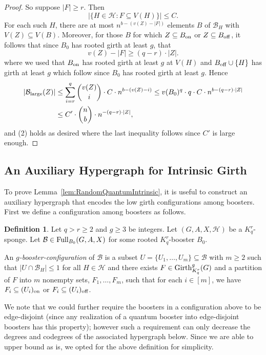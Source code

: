 \documentclass[11pt]{article}
\newcommand{\mc}[1]{\mathcal{#1}}
\newcounter{i}
\theoremstyle{plain}
\theoremstyle{plain} %
\theoremstyle{definition}
\newtheorem{definition}[thm]{Definition}
\begin{document}
\begin{proof}
So suppose $|F| \ge r$. Then
$$|\{H\in \mc{H}: F\subseteq V(H)\}| \le C.$$
For each such $H$, there are at most $n^{b - (v(Z)-|F|)}$ elements $B$ of $\mc{B}_H$ with $V(Z) \subseteq V(B)$. Moreover, for those $B$ for which $Z\subseteq B_{\rm on}$ or $Z\subseteq B_{\rm off}$, it follows that since $B_0$ has rooted girth at least $g$, that 
$$v(Z)-|F| \ge (q-r)\cdot |Z|.$$
where we used that $B_{\rm on}$ has rooted girth at least $g$ at $V(H)$ and $B_{\rm off}\cup \{H\}$ has girth at least $g$ which follow since $B_0$ has rooted girth at least $g$. Hence
\begin{align*}
|\mathcal{B}_{\rm large}(Z)| &\le \sum_{i=r}^{q} \binom{v(Z)}{i}\cdot  C \cdot n^{b-(v(Z)-i)} \le v(B_0)^q\cdot q\cdot C \cdot n^{b-(q-r)\cdot |Z|}\\
&\le C'\cdot \binom{n}{b}\cdot n^{-(q-r)\cdot |Z|},
\end{align*}
and (2) holds as desired where the last inequality follows since $C'$ is large enough.
\end{proof}

\subsection{An Auxiliary Hypergraph for Intrinsic Girth}

To prove Lemma~\ref{lem:RandomQuantumIntrinsic}, it is useful to construct an auxiliary hypergraph that encodes the low girth configurations among boosters. First we define a configuration among boosters as follows.

\begin{definition}\label{def:GirthBoosterConfig}
Let $q>r\ge 2$ and $g\ge 3$ be integers. Let $(G,A,X,\mc{H})$ be a $K_q^r$-sponge. Let $\mc{B} \in {\rm Full}_{B_0}(G,A,X)$ for some rooted $K_q^r$-booster $B_0$.

An \emph{$g$-booster-configuration} of $\mc{B}$ is a subset $U =\{U_1,\ldots,U_m\}\subseteq \mc{B}$ with $m\ge 2$ such that $|U\cap \mc{B}_H|\le 1$ for all $H\in \mc{H}$ and there exists $F\in {\rm Girth}_{K_q^r}^g(G)$ and a partition of $F$ into $m$ nonempty sets, $F_1,\ldots, F_m$, such that for each $i\in [m]$, we have $F_i\subseteq (U_i)_{\rm on}$ or $F_i\subseteq (U_i)_{\rm off}$.
\end{definition}

We note that we could further require the boosters in a configuration above to be edge-disjoint (since any realization of a quantum booster into edge-disjoint boosters has this property); however such a requirement can only decrease the degrees and codegrees of the associated hypergraph below. Since we are able to upper bound as is, we opted for the above definition for simplicity. 
\end{document}
